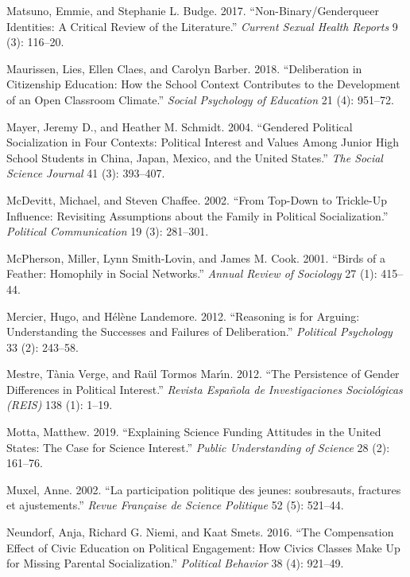 \documentclass[
  letterpaper,
  DIV=11,
  numbers=noendperiod]{scrreprt}
\newlength{\cslhangindent}
\newenvironment{CSLReferences}[2] %
 {\begin{list}{}{%
  \setlength{\itemindent}{0pt}
  \setlength{\leftmargin}{0pt}
  \setlength{\parsep}{0pt}
  \ifodd #1
   \setlength{\leftmargin}{\cslhangindent}
   \setlength{\itemindent}{-1\cslhangindent}
  \fi
  \setlength{\itemsep}{#2\baselineskip}}}
 {\end{list}}
\begin{document}
\begin{CSLReferences}{1}{0}
Matsuno, Emmie, and Stephanie L. Budge. 2017. {``{Non-Binary/Genderqueer
Identities: A Critical Review of the Literature}.''} \emph{Current
Sexual Health Reports} 9 (3): 116--20.

Maurissen, Lies, Ellen Claes, and Carolyn Barber. 2018. {``{Deliberation
in Citizenship Education: How the School Context Contributes to the
Development of an Open Classroom Climate}.''} \emph{Social Psychology of
Education} 21 (4): 951--72.

Mayer, Jeremy D., and Heather M. Schmidt. 2004. {``{Gendered Political
Socialization in Four Contexts: Political Interest and Values Among
Junior High School Students in China, Japan, Mexico, and the United
States}.''} \emph{The Social Science Journal} 41 (3): 393--407.

McDevitt, Michael, and Steven Chaffee. 2002. {``{From Top-Down to
Trickle-Up Influence: Revisiting Assumptions about the Family in
Political Socialization}.''} \emph{Political Communication} 19 (3):
281--301.

McPherson, Miller, Lynn Smith-Lovin, and James M. Cook. 2001. {``{Birds
of a Feather: Homophily in Social Networks}.''} \emph{Annual Review of
Sociology} 27 (1): 415--44.

Mercier, Hugo, and Hélène Landemore. 2012. {``{Reasoning is for Arguing:
Understanding the Successes and Failures of Deliberation}.''}
\emph{Political Psychology} 33 (2): 243--58.

Mestre, Tània Verge, and Raül Tormos Marı́n. 2012. {``{The Persistence of
Gender Differences in Political Interest}.''} \emph{Revista Espa{ñ}ola
de Investigaciones Sociol{ó}gicas (REIS)} 138 (1): 1--19.

Motta, Matthew. 2019. {``{Explaining Science Funding Attitudes in the
United States: The Case for Science Interest}.''} \emph{Public
Understanding of Science} 28 (2): 161--76.

Muxel, Anne. 2002. {``{La participation politique des jeunes:
soubresauts, fractures et ajustements}.''} \emph{Revue Fran{ç}aise de
Science Politique} 52 (5): 521--44.

Neundorf, Anja, Richard G. Niemi, and Kaat Smets. 2016. {``{The
Compensation Effect of Civic Education on Political Engagement: How
Civics Classes Make Up for Missing Parental Socialization}.''}
\emph{Political Behavior} 38 (4): 921--49.


\end{CSLReferences}
\end{document}
